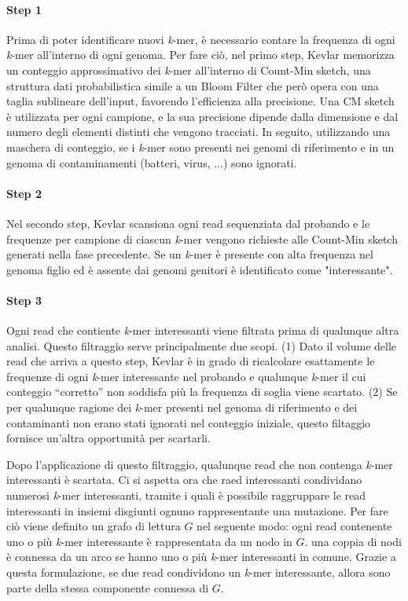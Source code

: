 \documentclass[../main.tex]{subfiles}
\begin{document}
\noindent
\paragraph{Step 1} Prima di poter identificare nuovi \textit{k}-mer, è necessario contare la frequenza di ogni \textit{k}-mer all'interno di ogni genoma. Per fare ciò, nel primo step, Kevlar memorizza un conteggio approssimativo dei \textit{k}-mer all'interno di Count-Min sketch, una struttura dati probabilistica simile a un Bloom Filter che però opera con una taglia sublineare dell'input, favorendo l'efficienza alla precisione. Una CM sketch è utilizzata per ogni campione, e la sua precisione dipende dalla dimensione e dal numero degli elementi distinti che vengono tracciati. In seguito, utilizzando una maschera di conteggio, se i \textit{k}-mer sono presenti nei genomi di riferimento e in un genoma di contaminamenti (batteri, virus, ...) sono ignorati.

\paragraph{Step 2} Nel secondo step, Kevlar scansiona ogni read sequenziata dal probando e le frequenze per campione di ciascun \textit{k}-mer vengono richieste alle Count-Min sketch generati nella fase precedente. Se un \textit{k}-mer è presente con alta frequenza nel genoma figlio ed è assente dai genomi genitori è identificato come "interessante". 

\paragraph{Step 3} Ogni read che contiente \textit{k}-mer interessanti viene filtrata prima di qualunque altra analisi. Questo filtraggio serve principalmente due scopi. (1) Dato il volume delle read che arriva a questo step, Kevlar è in grado di ricalcolare esattamente le frequenze di ogni \textit{k}-mer interessante nel probando e qualunque \textit{k}-mer il cui conteggio ``corretto'' non soddisfa più la frequenza di soglia viene scartato. (2) Se per qualunque ragione dei \textit{k}-mer presenti nel genoma di riferimento e dei contaminanti non erano stati ignorati nel conteggio iniziale, questo filtaggio fornisce un'altra opportunità per scartarli. 

Dopo l'applicazione di questo filtraggio, qualunque read che non contenga \textit{k}-mer interessanti è scartata. Ci si aspetta ora che raed interessanti condividano numerosi \textit{k}-mer interessanti, tramite i quali è possibile raggruppare le read interessanti in insiemi disgiunti ognuno rappresentante una mutazione. Per fare ciò viene definito un grafo di lettura $G$ nel seguente modo: ogni read contenente uno o più \textit{k}-mer interessante è rappresentata da un nodo in $G$. una coppia di nodi è connessa da un arco se hanno uno o più \textit{k}-mer interessanti in comune. Grazie a questa formulazione, se due read condividono un \textit{k}-mer interessante, allora sono parte della stessa componente connessa di $G$. 
\end{document}
